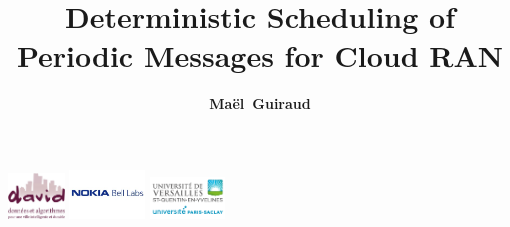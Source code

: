 \documentclass[10 pt]{beamer}
\title{Deterministic Scheduling of Periodic Messages for Cloud RAN}
\author{{\bf Maël~Guiraud}}
\institute[Nokia Bell Labs, DAVID-UVSQ] 
{
   Nokia Bell Labs France  - DAVID, Universit\'e de Versailles Saint Quentin 
 \\
}
\begin{document}
\begin{frame}

  \titlepage
  \centering
  \includegraphics [width=15mm]{logod.png} \hspace{1cm} \includegraphics [width=20mm]{logon.png} \hspace{1cm} \includegraphics [width=20mm]{logo.png} \\
\end{frame}
\end{document}

